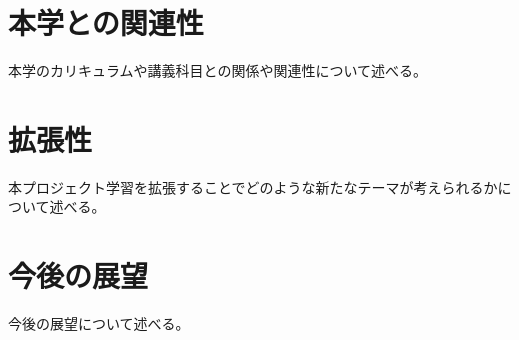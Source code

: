 \section{本学との関連性}
本学のカリキュラムや講義科目との関係や関連性について述べる。

\section{拡張性}
本プロジェクト学習を拡張することでどのような新たなテーマが考えられるかについて述べる。

\section{今後の展望}
今後の展望について述べる。

\newpage\clearpage
\vspace*{-20pt}
\printbibliography[segment=\therefsegment,heading=subbibliography]

